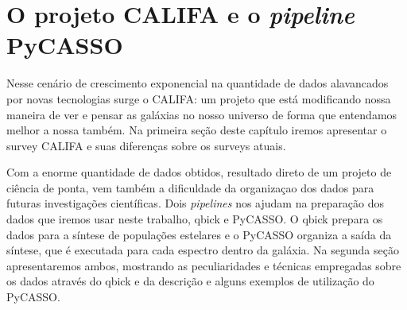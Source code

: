 


\chapter{O projeto CALIFA e o {\em pipeline} PyCASSO}
\label{sec:CALePyC}

Nesse cenário de crescimento exponencial na quantidade de dados alavancados por novas tecnologias surge o CALIFA: um
projeto que está modificando nossa maneira de ver e pensar as galáxias no nosso universo de forma que entendamos melhor
a nossa também. Na primeira seção deste capítulo iremos apresentar o survey CALIFA e suas diferenças sobre os surveys
atuais. 

Com a enorme quantidade de dados obtidos, resultado direto de um projeto de ciência de ponta, vem também a dificuldade
da organizaçao dos dados para futuras investigações científicas. Dois {\em pipelines} nos ajudam na preparação dos dados
que iremos usar neste trabalho, {\sc qbick} e PyCASSO. O qbick prepara os dados para a síntese de populações estelares e
o PyCASSO organiza a saída da síntese, que é executada para cada espectro dentro da galáxia. Na segunda seção
apresentaremos ambos, mostrando as peculiaridades e técnicas empregadas sobre os dados através do qbick e da descrição e
alguns exemplos de utilização do PyCASSO.


